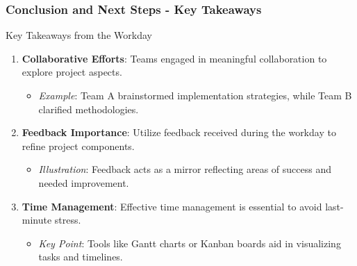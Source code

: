 \documentclass{beamer}
\begin{document}
\begin{frame}[fragile]
    \frametitle{Conclusion and Next Steps - Key Takeaways}
    \begin{block}{Key Takeaways from the Workday}
        \begin{enumerate}
            \item \textbf{Collaborative Efforts}: Teams engaged in meaningful collaboration to explore project aspects.
            \begin{itemize}
                \item \textit{Example}: Team A brainstormed implementation strategies, while Team B clarified methodologies.
            \end{itemize}

            \item \textbf{Feedback Importance}: Utilize feedback received during the workday to refine project components.
            \begin{itemize}
                \item \textit{Illustration}: Feedback acts as a mirror reflecting areas of success and needed improvement.
            \end{itemize}

            \item \textbf{Time Management}: Effective time management is essential to avoid last-minute stress.
            \begin{itemize}
                \item \textit{Key Point}: Tools like Gantt charts or Kanban boards aid in visualizing tasks and timelines.
            \end{itemize}
        \end{enumerate}
    \end{block}
\end{frame}
\end{document}

